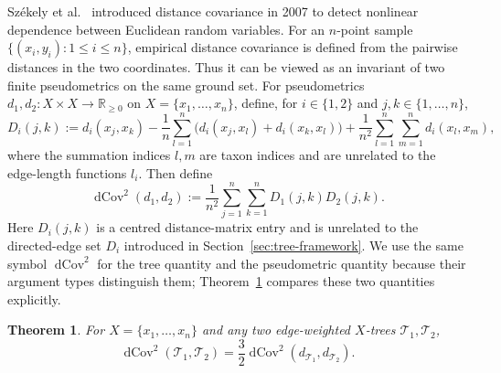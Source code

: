 \documentclass[pdflatex,sn-mathphys-num]{sn-jnl}
\theoremstyle{thmstyleone}
\newtheorem{theorem}{Theorem}
\DeclareMathOperator{\dCov}{dCov}
\begin{document}
Sz\'ekely et al.~\cite{SzekelyRizzoBakirov2007} introduced distance
covariance in 2007 to detect nonlinear dependence between Euclidean
random variables.  For an $n$-point sample
$\{(x_i,y_i):1\le i\le n\}$, empirical distance covariance is defined
from the pairwise distances in the two coordinates.  Thus it can be
viewed as an invariant of two finite pseudometrics on the same ground
set.  For pseudometrics $d_1,d_2:X\times X\to\mathbb R_{\ge0}$ on
$X=\{x_1,\ldots,x_n\}$, define, for $i\in\{1,2\}$ and
$j,k\in\{1,\ldots,n\}$,
\[
D_i(j,k):=d_i(x_j,x_k)
-\frac1n\sum_{l=1}^n\bigl(d_i(x_j,x_l)+d_i(x_k,x_l)\bigr)
+\frac1{n^2}\sum_{l=1}^n\sum_{m=1}^n d_i(x_l,x_m),
\]
where the summation indices $l,m$ are taxon indices and are unrelated to the
edge-length functions $l_i$.
Then define
\[
\dCov^2(d_1,d_2):=\frac1{n^2}\sum_{j=1}^n\sum_{k=1}^n
D_1(j,k)D_2(j,k).
\]
Here $D_i(j,k)$ is a centred distance-matrix entry and is unrelated to the
directed-edge set $D_i$ introduced in Section~\ref{sec:tree-framework}.  We use the same symbol
$\dCov^2$ for the tree quantity and the pseudometric quantity because their
argument types distinguish them; Theorem~\ref{thm:tree-distance-covariance}
compares these two quantities explicitly.

\begin{theorem}\label{thm:tree-distance-covariance}
For $X=\{x_1,\ldots,x_n\}$ and any two edge-weighted $X$-trees
$\mathcal T_1,\mathcal T_2$,
\[
\dCov^2(\mathcal T_1,\mathcal T_2)
=\frac32\dCov^2(d_{\mathcal T_1},d_{\mathcal T_2}).
\]
\end{theorem}
\end{document}
